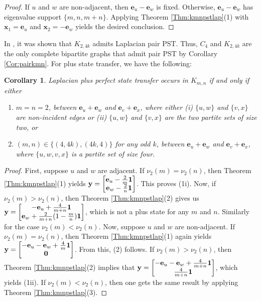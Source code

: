\documentclass[11pt]{article}
\newtheorem{corollary}[theorem]{Corollary}
\newcommand{\zero}{{\bf{0}}}
\newcommand{\ones}{{\bf{1}}}
\newcommand{\be}{\mathbf e}
\newcommand{\bx}{\mathbf x}
\newcommand{\by}{\mathbf y}
\begin{document}
\begin{proof}
If $u$ and $w$ are non-adjacent, then $\be_u-\be_w$ is fixed. Otherwise, $\be_u-\be_w$ has eigenvalue support $\{m,n,m+n\}$. 
Applying Theorem \ref{Thm:kmnpstlap}(1) with $\bx_1=\be_u$ and $\bx_2=-\be_w$ yields the desired conclusion.
\end{proof}

In \cite{chen2019edge}, it was shown that $K_{2,4k}$ admits Laplacian pair PST. Thus, $C_4$ and $K_{2,4k}$ are the only complete bipartite graphs that admit pair PST by Corollary \ref{Cor:pairkmn}. For plus state transfer, we have the following:

\begin{corollary}
\label{Cor:pairkmn1}
Laplacian plus perfect state transfer occurs in $K_{m,n}$ if and only if either
\begin{enumerate}
\item $m=n=2$, between $\be_u+\be_w$ and $\be_v+\be_x$, where either (i) $\{u,w\}$ and $\{v,x\}$ are non-incident edges or (ii) $\{u,w\}$ and $\{v,x\}$ are the two partite sets of size two, or
\item $(m,n)\in\{(4,4k),(4k,4)\}$ for any odd $k$, between $\be_u+\be_w$ and $\be_v+\be_x$, where $\{u,w,v,x\}$ is a partite set of size four.
\end{enumerate}
\end{corollary}

\begin{proof}
First, suppose $u$ and $w$ are adjacent. If $\nu_2(m)=\nu_2(n)$, then Theorem \ref{Thm:kmnpstlap}(1) yields $\by=\begin{bmatrix}
\be_u-\frac{2}{m} \ones \\ \be_w-\frac{2}{n} \ones\end{bmatrix}$. This proves (1i). Now, if $\nu_2(m)>\nu_2(n)$, then Theorem \ref{Thm:kmnpstlap}(2) gives us $\by=\begin{bmatrix}
-\be_u+\frac{4}{m+n} \ones \\ \be_w+\frac{2}{m+n}(1-\frac{m}{n})\ones\end{bmatrix}$, which is not a plus state for any $m$ and $n$. Similarly for the case $\nu_2(m)<\nu_2(n)$. Now, suppose $u$ and $w$ are non-adjacent. If $\nu_2(m)=\nu_2(n)$, then Theorem \ref{Thm:kmnpstlap}(1) again yields $\by=\begin{bmatrix}
-\be_u-\be_w+\frac{4}{m} \ones \\ \zero\end{bmatrix}$. From this, (2) follows. If $\nu_2(m)>\nu_2(n)$, then Theorem \ref{Thm:kmnpstlap}(2) implies that $\by=\begin{bmatrix}
-\be_u-\be_w+\frac{4}{m+n} \ones \\ \frac{4}{m+n} \ones\end{bmatrix}$, which yields (1ii). If $\nu_2(m)<\nu_2(n)$, then one gets the same result by applying Theorem \ref{Thm:kmnpstlap}(3).
\end{proof}
\end{document}

